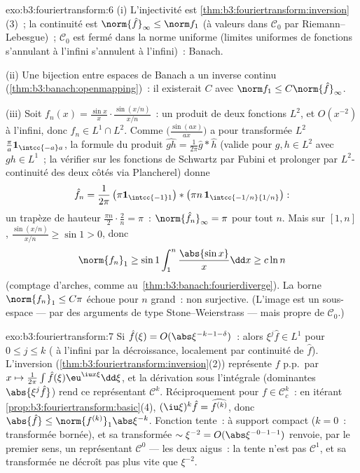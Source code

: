 \begin{solution}{exo:b3:fouriertransform:6}
(i) L'injectivité est
\cref{thm:b3:fouriertransform:inversion}(3)~; la continuité
est $\norm{\hat f}_\infty \leq \norm f_1$ (à valeurs dans
$\mathcal C_0$ par Riemann--Lebesgue)~; $\mathcal C_0$ est
fermé dans la norme uniforme (limites uniformes de fonctions
s'annulant à l'infini s'annulent à l'infini)~: Banach.

(ii) Une bijection  entre espaces de Banach a un
inverse continu (\cref{thm:b3:banach:openmapping})~: il
existerait $C$ avec $\norm f_1 \leq C\norm{\hat f}_\infty$.

(iii) Soit $f_n(x) = \frac{\sin x}x\cdot\frac{\sin(x/n)}{x/n}$~:
un produit de deux fonctions $L^2$, et $O(x^{-2})$ à
l'infini, donc $f_n \in L^1\cap L^2$. Comme
$\bigl(\frac{\sin(ax)}{ax}\bigr)$ a pour transformée $L^2$
$\frac\pi a\mathbf 1_{\intcc{-a}a}$, la formule du produit
$\widehat{gh} = \frac1{2\pi}\hat g * \hat h$ (valide pour $g,
h \in L^2$ avec $gh \in L^1$~; la vérifier sur les fonctions de
Schwartz par Fubini et prolonger par $L^2$-continuité des deux
côtés via Plancherel) donne
\[
\hat f_n = \frac1{2\pi}\,\bigl(\pi\mathbf
1_{\intcc{-1}1}\bigr) * \bigl(\pi n\,\mathbf
1_{\intcc{-1/n}{1/n}}\bigr):
\]
un trapèze de hauteur $\frac{\pi n}2\cdot\frac2n = \pi$~:
$\norm{\hat f_n}_\infty = \pi$ pour tout $n$. Mais sur $[1,
n]$, $\frac{\sin(x/n)}{x/n} \geq \sin 1 > 0$, donc
\[
\norm{f_n}_1 \geq \sin 1\int_1^n\frac{\abs{\sin x}}x\dd x
\geq c\ln n
\]
(comptage d'arches, comme au~\cref{thm:b3:banach:fourierdiverge}). La borne $\norm{f_n}_1
\leq C\pi$ échoue pour $n$ grand~: non surjective. (L'image
est un sous-espace  --- par des arguments de type
Stone--Weierstrass --- mais propre de $\mathcal C_0$.)
\end{solution}

\begin{solution}{exo:b3:fouriertransform:7}
Si $\hat f(\xi) = O(\abs\xi^{-k-1-\delta})$~: alors $\xi^j\hat
f \in L^1$ pour $0 \leq j \leq k$ ( à l'infini par
la décroissance, localement par continuité de $\hat f$).
L'inversion (\cref{thm:b3:fouriertransform:inversion}(2))
représente $f$ p.p.\ par $x \mapsto
\frac1{2\pi}\int\hat f(\xi)\eu^{\iu x\xi}\dd\xi$, et la
dérivation sous l'intégrale (dominantes $\abs{\xi^j\hat f}$)
rend ce représentant $\mathcal C^k$. Réciproquement pour $f
\in \mathcal C_c^k$~: en itérant
\cref{prop:b3:fouriertransform:basic}(4), $(\iu\xi)^k\hat f =
\widehat{f^{(k)}}$, donc $\abs{\hat f} \leq
\norm{f^{(k)}}_1\abs\xi^{-k}$. Fonction tente~:  à
support compact ($k = 0$~: transformée bornée), et sa
transformée $\sim \xi^{-2} = O(\abs\xi^{-0-1-1})$ renvoie, par
le premier sens, un représentant $\mathcal C^0$ --- les deux
aigus~: la tente n'est pas $\mathcal C^1$, et sa transformée
ne décroît pas plus vite que $\xi^{-2}$.
\end{solution}

